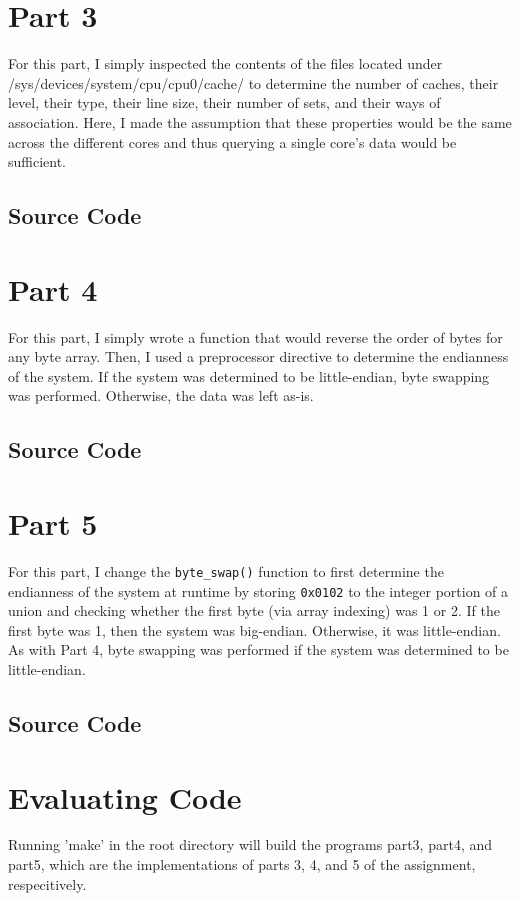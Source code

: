 \documentclass[12pt]{article}
\begin{document}
\section*{Part 3}
For this part, I simply inspected the contents of the files located under /sys/devices/system/cpu/cpu0/cache/ to determine the number of caches, their level, their type, their line size, their number of sets, and their ways of association. Here, I made the assumption that these properties would be the same across the different cores and thus querying a single core's data would be sufficient. 
\subsection*{Source Code}

\section*{Part 4}
For this part, I simply wrote a function that would reverse the order of bytes for any byte array. Then, I used a preprocessor directive to determine the endianness of the system. If the system was determined to be little-endian, byte swapping was performed. Otherwise, the data was left as-is.
\subsection*{Source Code}

\section*{Part 5}
For this part, I change the \verb!byte_swap()! function to first determine the endianness of the system at runtime by storing \verb!0x0102! to the integer portion of a union and checking whether the first byte (via array indexing) was 1 or 2. If the first byte was 1, then the system was big-endian. Otherwise, it was little-endian. As with Part 4, byte swapping was performed if the system was determined to be little-endian.
\subsection*{Source Code}

\section*{Evaluating Code}
Running 'make' in the root directory will build the programs part3, part4, and part5, which are the implementations of parts 3, 4, and 5 of the assignment, respecitively.
\end{document}
